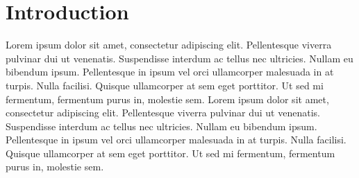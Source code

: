 \documentclass[../main.tex]{subfiles}
\begin{document}
    \newpage

	\chapter{Introduction}



Lorem ipsum dolor sit amet, consectetur adipiscing elit. Pellentesque viverra pulvinar dui ut venenatis.
Suspendisse interdum ac tellus nec ultricies. Nullam eu bibendum ipsum. Pellentesque in ipsum vel orci 
ullamcorper malesuada in at turpis. Nulla facilisi. Quisque ullamcorper at sem eget porttitor. Ut sed mi fermentum, 
fermentum purus in, molestie sem.
Lorem ipsum dolor sit amet, consectetur adipiscing elit. Pellentesque viverra pulvinar dui ut venenatis.
Suspendisse interdum ac tellus nec ultricies. Nullam eu bibendum ipsum. Pellentesque in ipsum vel orci 
ullamcorper malesuada in at turpis. Nulla facilisi. Quisque ullamcorper at sem eget porttitor. Ut sed mi fermentum, 
fermentum purus in, molestie sem.
\end{document}
